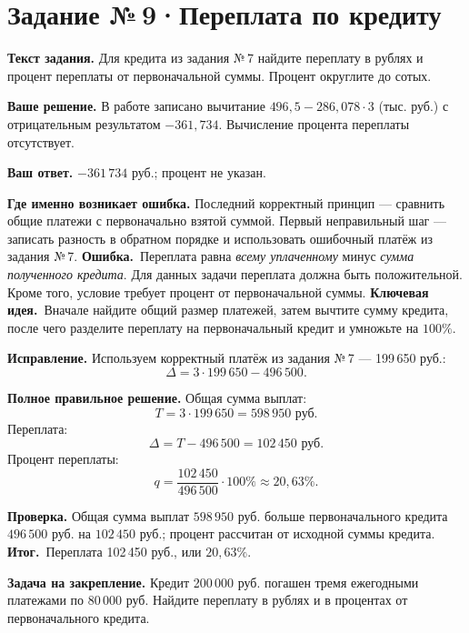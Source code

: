 \documentclass[a4paper,11pt]{article}
\newcommand{\err}{\textcolor{red!75!black}{\textbf{Ошибка.}}\ }
\newcommand{\idea}{\textcolor{accent}{\textbf{Ключевая идея.}}\ }
\newcommand{\result}{\textcolor{accent}{\textbf{Итог.}}\ }
\newcommand{\task}[2]{\clearpage\phantomsection\label{task:#1}\section*{Задание №\,#1\;·\;#2}}
\newcommand{\labelp}[1]{\par\smallskip\textbf{#1.}\enspace}
\begin{document}
\task{9}{Переплата по кредиту}
\labelp{Текст задания} Для кредита из задания №\,7 найдите переплату в рублях и процент переплаты от первоначальной суммы. Процент округлите до сотых.
\labelp{Ваше решение} В работе записано вычитание $496{,}5-286{,}078\cdot3$ (тыс. руб.) с отрицательным результатом $-361{,}734$. Вычисление процента переплаты отсутствует.
\labelp{Ваш ответ} $-361\,734$ руб.; процент не указан.
\labelp{Где именно возникает ошибка} Последний корректный принцип --- сравнить общие платежи с первоначально взятой суммой. Первый неправильный шаг --- записать разность в обратном порядке и использовать ошибочный платёж из задания №\,7.
\err Переплата равна \emph{всему уплаченному} минус \emph{сумма полученного кредита}. Для данных задачи переплата должна быть положительной. Кроме того, условие требует процент от первоначальной суммы.
\idea Вначале найдите общий размер платежей, затем вычтите сумму кредита, после чего разделите переплату на первоначальный кредит и умножьте на $100\%$.
\labelp{Исправление} Используем корректный платёж из задания №\,7 --- 199\,650 руб.:
\[\Delta=3\cdot199\,650-496\,500.\]
\labelp{Полное правильное решение} Общая сумма выплат:
\[T=3\cdot199\,650=598\,950\text{ руб.}\]
Переплата:
\[\Delta=T-496\,500=102\,450\text{ руб.}\]
Процент переплаты:
\[q=\frac{102\,450}{496\,500}\cdot100\%\approx20{,}63\%.\]
\labelp{Проверка} Общая сумма выплат $598\,950$ руб. больше первоначального кредита $496\,500$ руб. на $102\,450$ руб.; процент рассчитан от исходной суммы кредита.
\result Переплата 102\,450 руб., или $20{,}63\%$.
\labelp{Задача на закрепление} Кредит 200\,000 руб. погашен тремя ежегодными платежами по 80\,000 руб. Найдите переплату в рублях и в процентах от первоначального кредита.
\end{document}

